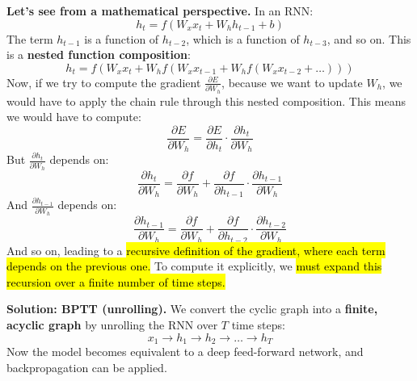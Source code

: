 \begin{deepeningbox}
    \highspace
    \textcolor{Red2}{ \textbf{Let's see from a mathematical perspective.}} In an RNN:
    \begin{equation*}
        h_t = f(W_x x_t + W_h h_{t-1} + b)
    \end{equation*}
    The term $h_{t-1}$ is a function of $h_{t-2}$, which is a function of $h_{t-3}$, and so on. This is a \textbf{nested function composition}:
    \begin{equation*}
        h_t = f\left(W_x x_t + W_h f\left(W_x x_{t-1} + W_h f\left(W_x x_{t-2} + \ldots\right)\right)\right)
    \end{equation*}
    Now, if we try to compute the gradient $\frac{\partial E}{\partial W_h}$, because we want to update $W_h$, we would have to apply the chain rule through this nested composition. This means we would have to compute:
    \begin{equation*}
        \frac{\partial E}{\partial W_h} = \frac{\partial E}{\partial h_t} \cdot \frac{\partial h_t}{\partial W_h}
    \end{equation*}
    But $\frac{\partial h_t}{\partial W_h}$ depends on:
    \begin{equation*}
        \frac{\partial h_t}{\partial W_h} = \frac{\partial f}{\partial W_h} + \frac{\partial f}{\partial h_{t-1}} \cdot \frac{\partial h_{t-1}}{\partial W_h}
    \end{equation*}
    And $\frac{\partial h_{t-1}}{\partial W_h}$ depends on:
    \begin{equation*}
        \frac{\partial h_{t-1}}{\partial W_h} = \frac{\partial f}{\partial W_h} + \frac{\partial f}{\partial h_{t-2}} \cdot \frac{\partial h_{t-2}}{\partial W_h}
    \end{equation*}
    And so on, leading to a \hl{recursive definition of the gradient, where each term depends on the previous one.} To compute it explicitly, we \hl{must expand this recursion over a finite number of time steps.}

    \highspace
    \textcolor{Green3}{ \textbf{Solution: BPTT (unrolling).}}
    We convert the cyclic graph into a \textbf{finite, acyclic graph} by unrolling the RNN over $T$ time steps:
    \begin{equation*}
        x_1 \rightarrow h_1 \rightarrow h_2 \rightarrow \ldots \rightarrow h_T
    \end{equation*}
    Now the model becomes equivalent to a deep feed-forward network, and backpropagation can be applied.


\end{deepeningbox}
